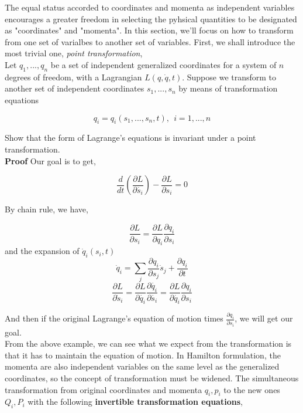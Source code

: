 \documentclass[12pt]{article}
\numberwithin{equation}{section}
\begin{document}
The equal status accorded to coordinates and momenta as independent variables encourages a greater freedom in selecting the pyhsical quantities to be designated as "coordinates" and "momenta". In this section, we'll focus on how to transform from one set of varialbes to another set of variables. First, we shall introduce the most trivial one, \textit{point transformation},
\\
Let $q_1, ..., q_n$ be a set of independent generalized coordinates for a system of $n$ degrees of freedom, with a Lagrangian $L(q, \dot{q}, t)$. Suppose we transform to another set of independent coordinates $s_1, ..., s_n$ by means of transformation equations

\begin{center}
    \[ q_i = q_i(s_1, ... ,s_n, t),\ \  i = 1, ... ,n \]
\end{center}

Show that the form of Lagrange's equations is invariant under a point transformation.
\\
\indent \textbf{Proof } Our goal is to get,

\begin{center}
    \[ \frac{d}{dt} \left( \frac{\partial L}{\partial \dot{s_i}} \right) - \frac{\partial L}{\partial s_i} = 0 \]
\end{center}

By chain rule, we have,

\begin{center}
    \[ \frac{\partial L}{\partial s_i} = \frac{\partial L}{\partial q_i}\frac{\partial q_i}{\partial s_i} \]
    and the expansion of $\dot{q}_i(s_i, t)$
    \[ \dot{q}_i = \sum_{j}{\frac{\partial q_i}{\partial s_j} \dot{s}_j} + \frac{\partial q_i}{\partial t} \]
    \[ \frac{\partial L}{\partial \dot{s}_i} = \frac{\partial L}{\partial \dot{q_i}} \frac{\partial \dot{q_i}}{\partial \dot{s_i}} = \frac{\partial L}{\partial \dot{q_i}} \frac{\partial q_i}{\partial s_i} \]
\end{center}

And then if the original Lagrange's equation of motion times $\frac{\partial q_i}{\partial s_i}$, we will get our goal.
\\
From the above example, we can see what we expect from the transformation is that it has to maintain the equation of motion. In Hamilton formulation, the momenta are also independent variables on the same level as the generalized coordinates, so the concept of transformation must be widened. The simultaneous transformation from original coordinates and momenta $q_i, p_i$ to the new ones $Q_i, P_i$ with the following \textbf{invertible transformation equations},
\end{document}
